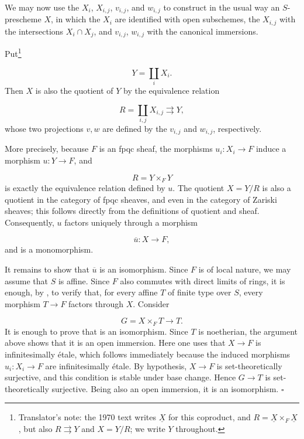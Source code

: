 We may now use the \(X_i\), \(X_{i,j}\), \(v_{i,j}\), and \(w_{i,j}\)
to construct in the usual way an \(S\)-prescheme \(X\), in which the
\(X_i\) are identified with open subschemes, the \(X_{i,j}\) with the
intersections \(X_i\cap X_j\), and \(v_{i,j}\), \(w_{i,j}\) with the
canonical immersions.

Put\footnote{Translator's note: the 1970 text writes \(\underline X\) for this coproduct,
and \(R=\underline X\times_F\underline X\), but also \(R\rightrightarrows Y\) and \(X=Y/R\); we
write \(Y\) throughout.}

\[
  Y=\coprod_i X_i.
\]
Then \(X\) is also the quotient of \(Y\) by the equivalence relation

\[
  R=\coprod_{i,j}X_{i,j}
  \rightrightarrows Y,
\]
whose two projections \(v,w\) are defined by the \(v_{i,j}\) and
\(w_{i,j}\), respectively.

More precisely, because \(F\) is an fpqc sheaf, the morphisms
\(u_i:X_i\to F\) induce a morphism \(u:Y\to F\), and

\[
  R=Y\times_FY
\]
is exactly the equivalence relation defined by \(u\).  The quotient
\(X=Y/R\) is also a quotient in the category of fpqc sheaves, and
even in the category of Zariski sheaves; this follows directly from
the definitions of quotient and sheaf.  Consequently, \(u\) factors
uniquely through a morphism

\[
  \overline u:X\longrightarrow F,
\]
and  is a monomorphism.

It remains to show that \(\overline u\) is an isomorphism.  Since
\(F\) is of local nature, we may assume that \(S\) is affine.  Since
\(F\) also commutes with direct limits of rings, it is enough, by
, to verify that, for every
affine \(T\) of finite type over \(S\), every morphism \(T\to F\)
factors through \(X\).  Consider

\[
  G=X\times_FT\longrightarrow T.
\]
It is enough to prove that  is an isomorphism.  Since
\(T\) is noetherian, the argument above shows that it is an open
immersion.  Here one uses that \(X\to F\) is infinitesimally étale,
which follows immediately because the induced morphisms
\(u_i:X_i\to F\) are infinitesimally étale.  By hypothesis,
\(X\to F\) is set-theoretically surjective, and this condition is
stable under base change.  Hence \(G\to T\) is set-theoretically
surjective.  Being also an open immersion, it is an isomorphism.
\hfill\(\square\)

